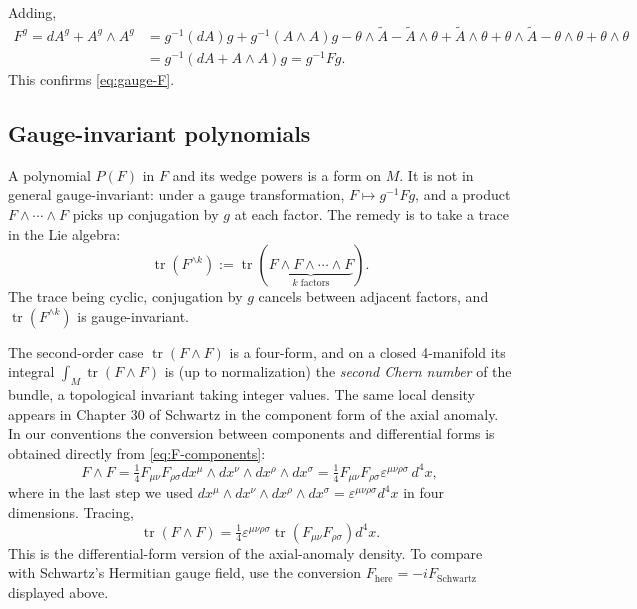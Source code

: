 \documentclass[11pt]{article}
\newcommand{\tr}{\operatorname{tr}}
\theoremstyle{definition}
\numberwithin{theorem}{section}
\numberwithin{equation}{section}
\begin{document}
\noindent Adding,
\begin{align*}
F^g = dA^g + A^g\wedge A^g &= g^{-1}(dA)g + g^{-1}(A\wedge A)g - \theta\wedge \tilde A - \tilde A\wedge\theta + \tilde A\wedge\theta + \theta\wedge \tilde A - \theta\wedge\theta + \theta\wedge\theta \\
&= g^{-1}(dA + A\wedge A)g = g^{-1}Fg.
\end{align*}
This confirms \eqref{eq:gauge-F}.

\subsection{Gauge-invariant polynomials}

A polynomial $P(F)$ in $F$ and its wedge powers is a form on $M$. It is not in general gauge-invariant: under a gauge transformation, $F\mapsto g^{-1}Fg$, and a product $F\wedge\cdots\wedge F$ picks up conjugation by $g$ at each factor. The remedy is to take a trace in the Lie algebra:
\begin{equation}\label{eq:trFk}
\tr\left(F^{\wedge k}\right) := \tr\left(\underbrace{F\wedge F\wedge\cdots\wedge F}_{k \text{ factors}}\right).
\end{equation}
The trace being cyclic, conjugation by $g$ cancels between adjacent factors, and $\tr(F^{\wedge k})$ is gauge-invariant.

\medskip

\noindent The second-order case $\tr(F\wedge F)$ is a four-form, and on a closed 4-manifold its integral $\int_M \tr(F\wedge F)$ is (up to normalization) the \emph{second Chern number} of the bundle, a topological invariant taking integer values. The same local density appears in Chapter 30 of Schwartz in the component form of the axial anomaly. In our conventions the conversion between components and differential forms is obtained directly from \eqref{eq:F-components}:
\begin{equation*}
F\wedge F = \tfrac{1}{4}F_{\mu\nu}F_{\rho\sigma}dx^\mu\wedge dx^\nu\wedge dx^\rho\wedge dx^\sigma = \tfrac{1}{4}F_{\mu\nu}F_{\rho\sigma}\varepsilon^{\mu\nu\rho\sigma}\, d^4x,
\end{equation*}
where in the last step we used $dx^\mu\wedge dx^\nu\wedge dx^\rho\wedge dx^\sigma = \varepsilon^{\mu\nu\rho\sigma}d^4 x$ in four dimensions. Tracing,
\begin{equation*}
\tr(F\wedge F) = \tfrac{1}{4}\varepsilon^{\mu\nu\rho\sigma}\tr(F_{\mu\nu}F_{\rho\sigma})d^4 x.
\end{equation*}
This is the differential-form version of the axial-anomaly density. To compare with Schwartz's Hermitian gauge field, use the conversion $F_{\text{here}}=-iF_{\text{Schwartz}}$ displayed above.
\end{document}
